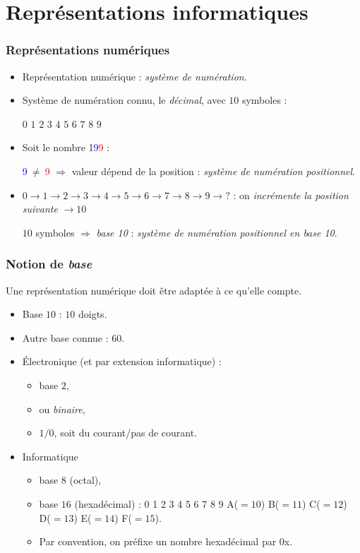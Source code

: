\section{Repr\'esentations informatiques}

	\frame
	{
		\frametitle{Repr\'esentations num\'eriques}
		\begin{itemize}
			\item<1-> Repr\'esentation num\'erique : \emph{syst\`eme de num\'eration}.
			\item<2-> Syst\`eme de num\'eration connu, le \emph{d\'ecimal}, avec $10$ symboles :
				
			$0$ $1$ $2$ $3$ $4$ $5$ $6$ $7$ $8$ $9$
			\item<3-> Soit le nombre 1\textcolor{blue}{9}\textcolor{red}{9} :
			
			\textcolor{blue}{9}$~\neq~$\textcolor{red}{9}
			$\Rightarrow$ valeur d\'epend de la position : \emph{syst\`eme de num\'eration positionnel}.

			\item<4-> $0 \rightarrow 1\rightarrow  2 \rightarrow 3 \rightarrow 4 \rightarrow 5 \rightarrow 6 \rightarrow 7 \rightarrow 8 \rightarrow 9\rightarrow ?$ : on \emph{incr\'emente la position suivante} $\rightarrow 10$
			
			$10$ symboles $\Rightarrow$ \emph{base 10} : \emph{syst\`eme de num\'eration positionnel en base 10}.
		\end{itemize}
	}
	
	\frame
	{
		\frametitle{Notion de \emph{base}}
		
		Une repr\'esentation num\'erique doit \^etre adapt\'ee \`a ce qu'elle compte.
		\begin{itemize}
			\item<2-> Base $10$ : $10$ doigts.
			\item<3-> Autre base connue :  $60$.
			\item<4-> \'Electronique (et par extension informatique) :
			\begin{itemize}
				\item<5-> base $2$,
				\item<6-> ou \emph{binaire},
				\item<7-> $1/0$, soit du courant/pas de courant.
			\end{itemize}
			\item<8-> Informatique
			\begin{itemize}
				\item<9-> base $8$ (octal),
				\item<10-> base $16$ (hexad\'ecimal) : 0 1 2 3 4 5 6 7 8 9 A($=10$) B($=11$) C($=12$) D($=13$) E($=14$) F($=15$).
				\item<11-> Par convention, on pr\'efixe un nombre hexad\'ecimal par 0x.
			\end{itemize}
		\end{itemize}
	}
	
